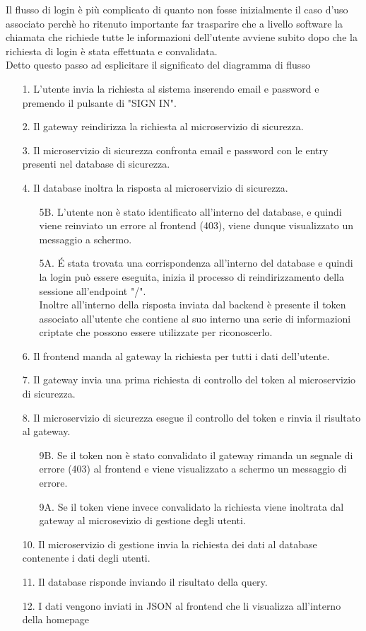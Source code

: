 Il flusso di login è più complicato di quanto non fosse inizialmente il caso d'uso associato perchè ho ritenuto importante far trasparire che a livello software la chiamata che richiede tutte le informazioni dell'utente avviene subito dopo che la richiesta di login è stata effettuata e convalidata.
\\
Detto questo passo ad esplicitare il significato del diagramma di flusso
\\
\begin{itemize}
    \item[1.] L'utente invia la richiesta al sistema inserendo email e password e premendo il pulsante di "SIGN IN".
    \item[2.] Il gateway reindirizza la richiesta al microservizio di sicurezza.
    \item[3.] Il microservizio di sicurezza confronta email e password con le entry presenti nel database di sicurezza.
    \item[4.] Il database inoltra la risposta al microservizio di sicurezza.
    \begin{itemize}
        \item[5B.] L'utente non è stato identificato all'interno del database, e quindi viene reinviato un errore al frontend (403), viene dunque visualizzato un messaggio a schermo.
        \item[5A.] \'E stata trovata una corrispondenza all'interno del database e quindi la login può essere eseguita, inizia il processo di reindirizzamento della sessione all'endpoint "/".
        \\
        Inoltre all'interno della risposta inviata dal backend è presente il token associato all'utente che contiene al suo interno una serie di informazioni criptate che possono essere utilizzate per riconoscerlo.
    \end{itemize}
    \item[6.] Il frontend manda al gateway la richiesta per tutti i dati dell'utente.
    \item[7.] Il gateway invia una prima richiesta di controllo del token al microservizio di sicurezza.
    \item[8.] Il microservizio di sicurezza esegue il controllo del token e rinvia il risultato al gateway.
    \begin{itemize}
        \item[9B.] Se il token non è stato convalidato il gateway rimanda un segnale di errore (403) al frontend e viene visualizzato a schermo un messaggio di errore.
        \item[9A.] Se il token viene invece convalidato la richiesta viene inoltrata dal gateway al microsevizio di gestione degli utenti.
    \end{itemize}
    \item[10.] Il microservizio di gestione invia la richiesta dei dati al database contenente i dati degli utenti.
    \item[11.] Il database risponde inviando il risultato della query.
    \item[12.] I dati vengono inviati in JSON al frontend che li visualizza all'interno della homepage
\end{itemize}

